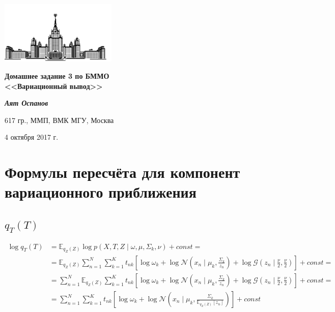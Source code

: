 \documentclass[12pt, a4paper]{article}
\begin{document}
    \begin{singlespace}
    \begin{center}
        \includegraphics[height=3cm]{msu.png}

        {\large\textbf{Домашнее задание 3 по БММО\\
        <<Вариационный вывод>>}\\}

        \vspace{0.3cm}

        \textit{\textbf{Аят Оспанов}}

        617 гр., ММП, ВМК МГУ, Москва

        4 октября 2017 г.
    \end{center}
    \end{singlespace}

    \tableofcontents

    \section{Формулы пересчёта для компонент вариационного приближения}
        \subsection{$q_T(T)$}
            \begin{align*}
                \log q_T(T) &= \mathbb{E}_{q_Z(Z)}\log p(X, T, Z\mid \omega, \mu, \Sigma_k, \nu) + const = \\
                &= \mathbb{E}_{q_Z(Z)}\sum_{n=1}^{N}\sum_{k=1}^{K}t_{nk}\left[\log\omega_k + \log\mathcal{N}(x_n\mid \mu_k, \frac{\Sigma_k}{z_n}) + \log\mathcal{G}(z_n\mid \frac{\nu}{2}, \frac{\nu}{2}) \right] + const = \\
                &= \sum_{n=1}^{N}\mathbb{E}_{q_Z(Z)}\sum_{k=1}^{K}t_{nk}\left[\log\omega_k + \log\mathcal{N}(x_n\mid \mu_k, \frac{\Sigma_k}{z_n}) + \log\mathcal{G}(z_n\mid \frac{\nu}{2}, \frac{\nu}{2}) \right] + const = \\
                &= \sum_{n=1}^{N}\sum_{k=1}^{K}t_{nk}\left[\log\omega_k + \log\mathcal{N}(x_n\mid \mu_k, \frac{\Sigma_k}{\mathbb{E}_{q_Z(Z)}\left[z_n\right]}) \right] + const
            \end{align*}
\end{document}
